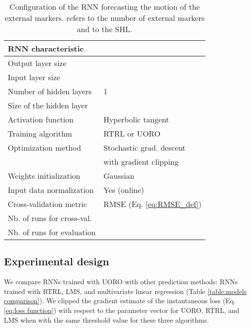 \documentclass[twocolumn,a4paper]{svjour3} \sloppy          \smartqed
\begin{document}
\begin{table}[thb!]
\normalsize
\setlength{\tabcolsep}{5pt}
\begin{tabular}{ll}
\hline
RNN characteristic &  \\
\hline
Output layer size       &  \\
Input layer size        & \\
Number of hidden layers & 1 \\
Size of the hidden layer &  \\
Activation function  &  Hyperbolic tangent \\
Training algorithm &  RTRL or UORO\\
Optimization method & Stochastic grad. descent \\ 
                    & with gradient clipping \\
Weights initialization & Gaussian \\
Input data normalization & Yes (online)\\
Cross-validation metric & RMSE (Eq. \ref{eq:RMSE_def}) \\
Nb. of runs for cross-val. & \\
Nb. of runs for evaluation &  \\
\hline
\end{tabular}
\caption{Configuration of the RNN forecasting the motion of the external markers.  refers to the number of external markers and  to the SHL.}
\label{table:RNNs_configuration}
\end{table} 


\subsection{Experimental design}

We compare RNNs trained with UORO with other prediction methods: RNNs trained with RTRL, LMS, and multivariate linear regression (Table \ref{table:models comparison}). We clipped the gradient estimate of the instantaneous loss (Eq. \ref{eq:loss function}) with respect to the parameter vector  for UORO, RTRL, and LMS when  with the same threshold value  for these three algorithms.
\end{document}
